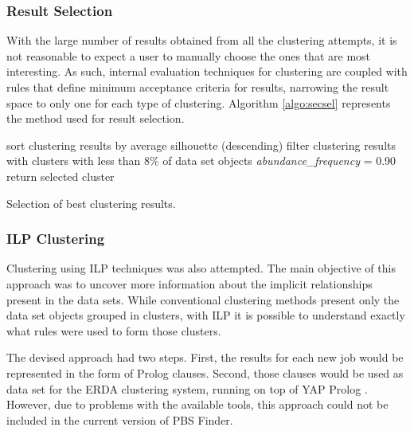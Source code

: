 \subsubsection*{Result Selection}

With the large number of results obtained from all the clustering attempts, it
is not reasonable to expect a user to manually choose the ones that are most
interesting. As such, internal evaluation techniques for clustering are coupled
with rules that define minimum acceptance criteria for results, narrowing the
result space to only one for each type of clustering. Algorithm
\ref{algo:secsel} represents the method used for result selection.

\begin{algorithm}
  sort clustering results by average silhouette (descending)\;
  filter clustering results with clusters with less than 8\% of data set objects\;
  \emph{abundance\_frequency} = 0.90\;
   {
    return selected cluster\;
  }

  \caption[Selection of best clustering results]{
    Selection of best clustering results.
  }
  \label{algo:secsel}
\end{algorithm}

\subsubsection*{ILP Clustering}

Clustering using ILP techniques was also attempted. The main objective of this
approach was to uncover more information about the implicit relationships
present in the data sets. While conventional clustering methods present only the
data set objects grouped in clusters, with ILP it is possible to understand
exactly what rules were used to form those clusters.

The devised approach had two steps. First, the results for each new job would be
represented in the form of Prolog clauses. Second, those clauses would be used
as data set for the ERDA \cite{fonseca2012conceptual} clustering system, running
on top of YAP Prolog \cite{citeulike:8884858}. However, due to problems with the
available tools, this approach could not be included in the current version of
PBS Finder.

